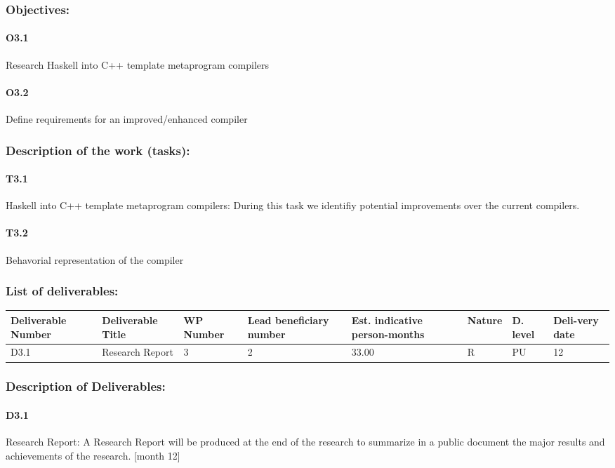 \documentclass{article}
\begin{document}
\subsubsection{Objectives:}
\paragraph{O3.1} Research Haskell into C++ template metaprogram compilers
\paragraph{O3.2} Define requirements for an improved/enhanced compiler
\subsubsection{Description of the work (tasks):}
\paragraph{T3.1} Haskell into C++ template metaprogram compilers: During this task we identifiy potential improvements over the current compilers.
\paragraph{T3.2} Behavorial representation of the compiler

\subsubsection{List of deliverables:}
\begin{center}
	\begin{tabular}{ |p{1.6cm}|p{2cm}|p{0.8cm}|p{0.8cm}|p{0.9cm}|p{1cm}|p{0.5cm}|p{0.8cm}| }
		\hline
		Deliverable Number & Deliverable Title & WP Number & Lead beneficiary number & Est. indicative person-months & Nature & D. level & Deli-very date \\ \hline
		D3.1 & Research Report & 3 & 2 & 33.00 & R & PU & 12 \\ \hline
	\end{tabular}
\end{center}

\subsubsection{Description of Deliverables:}
\paragraph{D3.1} Research Report: A Research Report will be produced at the end of the research to summarize in a public document the major results and achievements of the research. [month 12]
\end{document}
